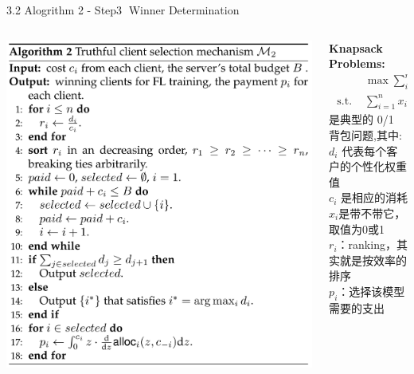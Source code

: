 \documentclass{sintefbeamer}
\theoremstyle{definition}
\begin{document}
\begin{frame}{3.2 Alogrithm 2 - Step\textcircled{3} Winner Determination}{\empty}
\begin{columns}
\begin{column}{0.5\textwidth}
\vspace{0.5em}
\includegraphics[width=1\textwidth]{images/algo2}
\end{column}
\begin{column}{0.5\textwidth}
\textbf{Knapsack Problems:}
$$
\begin{aligned}
& \max \sum_{i=1}^n x_i \cdot d_i, \\
\text { s.t. } & \sum_{i=1}^n x_i \cdot c_i \leq B, \forall i, x_i \in\{0,1\} .
\end{aligned}
$$
是典型的 0/1 背包问题,其中:\\
$d_i$ 代表每个客户的个性化权重值\\
$c_i$ 是相应的消耗\\
$x_i$是带不带它，取值为0或1\\

$r_i$：ranking，其实就是按效率的排序\\
$p_i$：选择该模型需要的支出
\end{column}
\end{columns}
\end{frame}
\end{document}
